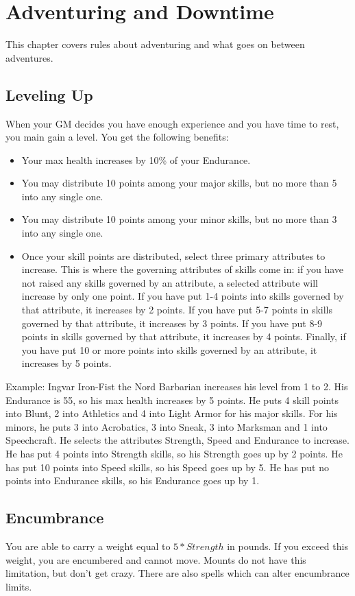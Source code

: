 \chapter{Adventuring and Downtime}
This chapter covers rules about adventuring and what goes on between adventures.

\section{Leveling Up}
When your GM decides you have enough experience and you have time to rest, you main gain a level. You get the following benefits:

\begin{itemize}
	\item Your max health increases by 10\% of your Endurance.
	\item You may distribute 10 points among your major skills, but no more than 5 into any single one.
	\item You may distribute 10 points among your minor skills, but no more than 3 into any single one.
	\item Once your skill points are distributed, select three primary attributes to increase. This is where the governing attributes of skills come in: if you have not raised any skills governed by an attribute, a selected attribute will increase by only one point. If you have put 1-4 points into skills governed by that attribute, it increases by 2 points. If you have put 5-7 points in skills governed by that attribute, it increases by 3 points. If you have put 8-9 points in skills governed by that attribute, it increases by 4 points. Finally, if you have put 10 or more points into skills governed by an attribute, it increases by 5 points.
\end{itemize}

Example: Ingvar Iron-Fist the Nord Barbarian increases his level from 1 to 2. His Endurance is 55, so his max health increases by 5 points. He puts 4 skill points into Blunt, 2 into Athletics and 4 into Light Armor for his major skills. For his minors, he puts 3 into Acrobatics, 3 into Sneak, 3 into Marksman and 1 into Speechcraft. He selects the attributes Strength, Speed and Endurance to increase. He has put 4 points into Strength skills, so his Strength goes up by 2 points. He has put 10 points into Speed skills, so his Speed goes up by 5. He has put no points into Endurance skills, so his Endurance goes up by 1.

\section{Encumbrance}
You are able to carry a weight equal to $5*Strength$ in pounds. If you exceed this weight, you are encumbered and cannot move. Mounts do not have this limitation, but don't get crazy. There are also spells which can alter encumbrance limits.

